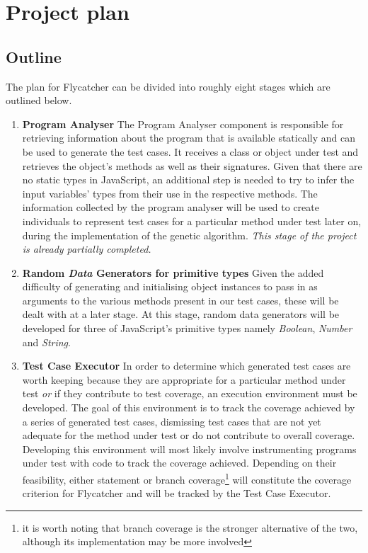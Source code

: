 \documentclass[a4paper,11pt,titlepage]{report}
\begin{document}
\chapter{Project plan}

\section{Outline}
\label{sec:project_outline}
The plan for \textsf{Flycatcher} can be divided into roughly eight stages which are outlined below.

\begin{enumerate}
	
	\item{\textbf{Program Analyser}} The Program Analyser component is responsible for retrieving information about the program that is available statically and can be used to generate the test cases. It receives a class or object under test and retrieves the object's methods as well as their signatures. Given that there are no static types in JavaScript, an additional step is needed to try to infer the input variables' types from their use in the respective methods. The information collected by the program analyser will be used to create individuals to represent test cases for a particular method under test later on, during the implementation of the genetic algorithm. \emph{This stage of the project is already partially completed.}
	 
	\item{\textbf{Random \emph{Data} Generators for primitive types}} Given the added difficulty of generating and initialising object instances to pass in as arguments to the various methods present in our test cases, these will be dealt with at a later stage. At this stage, random data generators will be developed for three of JavaScript's primitive types namely \emph{Boolean}, \emph{Number} and \emph{String}.

	\item{\textbf{Test Case Executor}} In order to determine which generated test cases are worth keeping because they are appropriate for a particular method under test \emph{or} if they contribute to test coverage, an execution environment must be developed. The goal of this environment is to track the coverage achieved by a series of generated test cases, dismissing test cases that are not yet adequate for the method under test or do not contribute to overall coverage. Developing this environment will most likely involve instrumenting programs under test with code to track the coverage achieved. Depending on their feasibility, either statement or branch coverage\footnote{it is worth noting that branch coverage is the stronger alternative of the two, although its implementation may be more involved} will constitute the coverage criterion for \textsf{Flycatcher} and will be tracked by the Test Case Executor.


\end{enumerate}
\end{document}
